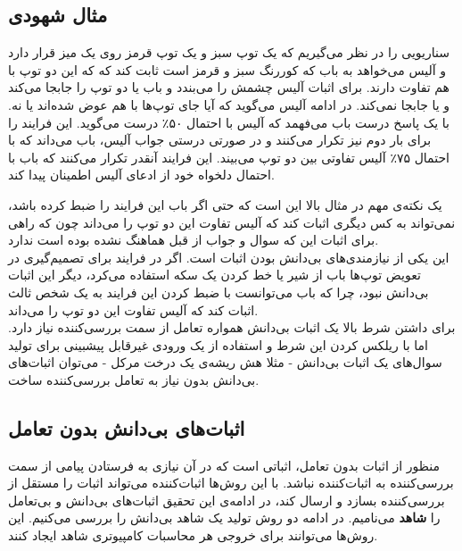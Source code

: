 \subsection{مثال شهودی}
سناریویی را در نظر می‌گیریم که یک توپ سبز و یک توپ قرمز روی یک میز قرار دارد و آلیس می‌خواهد به باب که کوررنگ سبز و قرمز است ثابت کند که که این دو توپ با هم تفاوت دارند. برای اثبات آلیس چشمش را می‌بندد و باب یا دو توپ را جابجا می‌کند و یا جابجا نمی‌کند. در ادامه آلیس می‌گوید که آیا جای توپ‌ها با هم عوض شده‌اند یا نه. با یک پاسخ درست باب می‌فهمد که آلیس با احتمال ۵۰٪ درست می‌گوید. این فرایند را برای بار دوم نیز تکرار می‌کنند و در صورتی درستی جواب آلیس، باب می‌داند که با احتمال ۷۵٪ آلیس تفاوتی بین دو توپ می‌بیند. این فرایند آنقدر تکرار می‌کنند که باب با احتمال دلخواه خود از ادعای آلیس اطمینان پیدا کند.
\par
یک نکته‌ی مهم در مثال بالا این است که حتی اگر باب این فرایند را ضبط کرده باشد، نمی‌تواند به کس دیگری اثبات کند که آلیس تفاوت این دو توپ را می‌داند چون که راهی برای اثبات این که سوال و جواب از قبل هماهنگ نشده بوده است ندارد. 
\\
این یکی از نیازمندی‌های بی‌دانش بودن اثبات است. اگر در فرایند برای تصمیم‌گیری در تعویض توپ‌ها باب از شیر یا خط کردن یک سکه استفاده می‌کرد، دیگر این اثبات بی‌دانش نبود، چرا که باب می‌توانست با ضبط کردن این فرایند به یک شخص ثالث اثبات کند که آلیس تفاوت این دو توپ را می‌داند. 
\\
برای داشتن شرط بالا یک اثبات بی‌دانش همواره تعامل از سمت بررسی‌کننده نیاز دارد. اما با ریلکس کردن این شرط و استفاده از یک ورودی غیرقابل پیشبینی برای تولید سوال‌های یک اثبات بی‌دانش - مثلا هش ریشه‌ی یک درخت مرکل - می‌توان اثبات‌های بی‌دانش بدون نیاز به تعامل بررسی‌کننده ساخت. 


\subsection{اثبات‌های بی‌دانش بدون تعامل} 
منظور از اثبات بدون تعامل، اثباتی‌ است که در آن نیازی به فرستادن پیامی از سمت بررسی‌کننده به اثبات‌کننده نباشد. با این روش‌ها اثبات‌کننده می‌تواند اثبات را مستقل از بررسی‌کننده بسازد و ارسال کند، در ادامه‌ی این تحقیق اثبات‌های بی‌دانش و بی‌تعامل را 
\textbf{شاهد}
می‌نامیم. در ادامه دو روش تولید یک شاهد بی‌دانش را بررسی می‌کنیم. این روش‌ها می‌توانند برای خروجی هر محاسبات کامپیوتری شاهد ایجاد کنند. 

